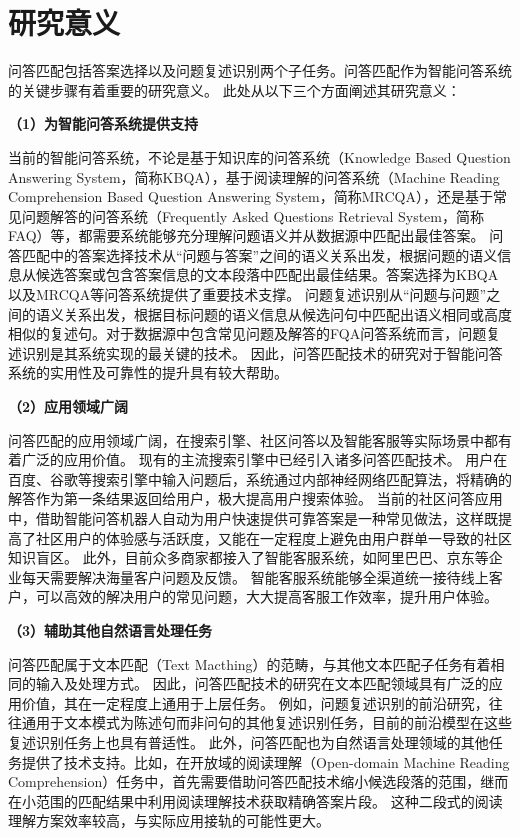 
\section{研究意义}
问答匹配包括答案选择以及问题复述识别两个子任务。问答匹配作为智能问答系统的关键步骤有着重要的研究意义。
此处从以下三个方面阐述其研究意义：

\textbf{\songti（1）为智能问答系统提供支持}

当前的智能问答系统，不论是基于知识库的问答系统（Knowledge Based Question Answering System，简称KBQA），基于阅读理解的问答系统（Machine Reading Comprehension Based Question Answering System，简称MRCQA），还是基于常见问题解答的问答系统（Frequently Asked Questions Retrieval System，简称FAQ）等，都需要系统能够充分理解问题语义并从数据源中匹配出最佳答案。
问答匹配中的答案选择技术从“问题与答案”之间的语义关系出发，根据问题的语义信息从候选答案或包含答案信息的文本段落中匹配出最佳结果。答案选择为KBQA以及MRCQA等问答系统提供了重要技术支撑。
问题复述识别从“问题与问题”之间的语义关系出发，根据目标问题的语义信息从候选问句中匹配出语义相同或高度相似的复述句。对于数据源中包含常见问题及解答的FQA问答系统而言，问题复述识别是其系统实现的最关键的技术。
因此，问答匹配技术的研究对于智能问答系统的实用性及可靠性的提升具有较大帮助。

\textbf{\songti（2）应用领域广阔}

问答匹配的应用领域广阔，在搜索引擎、社区问答以及智能客服等实际场景中都有着广泛的应用价值。
现有的主流搜索引擎中已经引入诸多问答匹配技术。
用户在百度、谷歌等搜索引擎中输入问题后，系统通过内部神经网络匹配算法，将精确的解答作为第一条结果返回给用户，极大提高用户搜索体验。
当前的社区问答应用中，借助智能问答机器人自动为用户快速提供可靠答案是一种常见做法，这样既提高了社区用户的体验感与活跃度，又能在一定程度上避免由用户群单一导致的社区知识盲区。
此外，目前众多商家都接入了智能客服系统，如阿里巴巴、京东等企业每天需要解决海量客户问题及反馈。
智能客服系统能够全渠道统一接待线上客户，可以高效的解决用户的常见问题，大大提高客服工作效率，提升用户体验。

\textbf{\songti（3）辅助其他自然语言处理任务}

问答匹配属于文本匹配（Text Macthing）的范畴，与其他文本匹配子任务有着相同的输入及处理方式。
因此，问答匹配技术的研究在文本匹配领域具有广泛的应用价值，其在一定程度上通用于上层任务。
例如，问题复述识别的前沿研究，往往通用于文本模式为陈述句而非问句的其他复述识别任务，目前的前沿模型在这些复述识别任务上也具有普适性。
此外，问答匹配也为自然语言处理领域的其他任务提供了技术支持。比如，在开放域的阅读理解（Open-domain Machine Reading Comprehension）任务中，首先需要借助问答匹配技术缩小候选段落的范围，继而在小范围的匹配结果中利用阅读理解技术获取精确答案片段。
这种二段式的阅读理解方案效率较高，与实际应用接轨的可能性更大。

